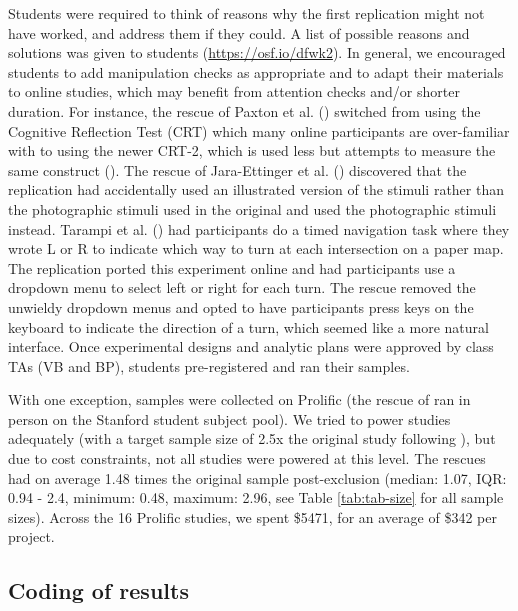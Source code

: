\documentclass[
  english,
  a4paper,
]{article}
\begin{document}
Students were required to think of reasons why the first replication might not have worked, and address them if they could.
A list of possible reasons and solutions was given to students (\url{https://osf.io/dfwk2}).
In general, we encouraged students to add manipulation checks as appropriate and to adapt their materials to online studies, which may benefit from attention checks and/or shorter duration.
For instance, the rescue of Paxton et al. () switched from using the Cognitive Reflection Test (CRT) which many online participants are over-familiar with to using the newer CRT-2, which is used less but attempts to measure the same construct ().
The rescue of Jara-Ettinger et al. () discovered that the replication had accidentally used an illustrated version of the stimuli rather than the photographic stimuli used in the original and used the photographic stimuli instead.
Tarampi et al. () had participants do a timed navigation task where they wrote L or R to indicate which way to turn at each intersection on a paper map.
The replication ported this experiment online and had participants use a dropdown menu to select left or right for each turn.
The rescue removed the unwieldy dropdown menus and opted to have participants press keys on the keyboard to indicate the direction of a turn, which seemed like a more natural interface.
Once experimental designs and analytic plans were approved by class TAs (VB and BP), students pre-registered and ran their samples.

With one exception, samples were collected on Prolific (the rescue of  ran in person on the Stanford student subject pool).
We tried to power studies adequately (with a target sample size of 2.5x the original study following ), but due to cost constraints, not all studies were powered at this level.
The rescues had on average 1.48 times the original sample post-exclusion (median: 1.07, IQR: 0.94 - 2.4, minimum: 0.48, maximum: 2.96, see Table \ref{tab:tab-size} for all sample sizes).
Across the 16 Prolific studies, we spent \$5471, for an average of \$342 per project.

\subsection{Coding of results}\label{coding-of-results}
\end{document}
